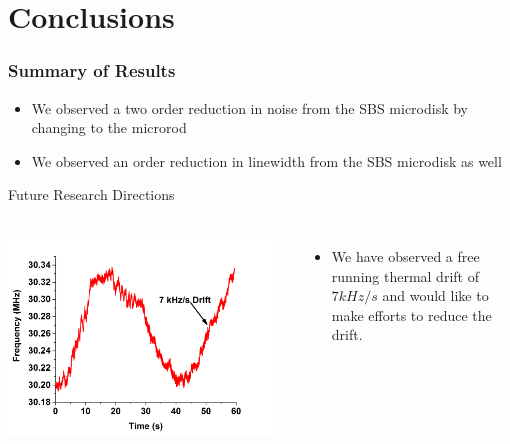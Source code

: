\documentclass{beamer}
\begin{document}
\section{Conclusions}
\begin{frame}\frametitle{Summary of Results}
\begin{itemize}
\item We observed a two order reduction in noise from the SBS microdisk by changing to the microrod
\item We observed an order reduction in linewidth from the SBS microdisk as well
\end{itemize}

\begin{block}{Future Research Directions}
\begin{columns}
\includegraphics[width=0.95\textwidth]{Images/Thermal_Drift.png}
\begin{itemize}
\item We have observed a free running thermal drift of $7kHz/s$ and would like to make efforts to reduce the drift.
\end{itemize}
\end{columns}

\end{block}
\end{frame}
\end{document}
